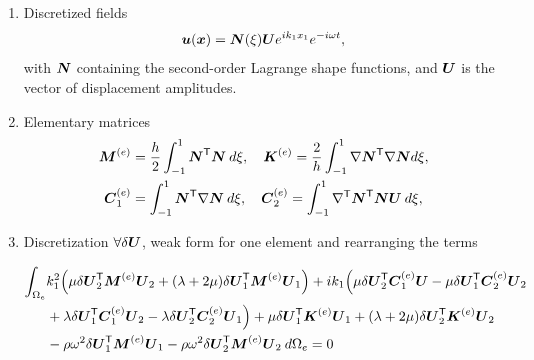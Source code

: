 \begin{enumerate}
\item Discretized fields 
\begin{equation}
    \boldsymbol u (\boldsymbol x) =\boldsymbol N (\xi) \boldsymbol U e^{ik_1 x_1}e^{-i\omega t},
\end{equation}
with $\boldsymbol N$ containing the second-order Lagrange shape functions, and $\boldsymbol U$ is the vector of displacement amplitudes.

\item Elementary matrices
\begin{equation}
    \begin{aligned}
        \boldsymbol M^{(e)}   &= \frac{h}{2} \int_{-1}^1 \boldsymbol N^\mathsf T \boldsymbol N \:d\xi, \quad
        \boldsymbol K^{(e)}   = \frac 2 h \int_{-1}^1 \nabla \boldsymbol N^{\mathsf T} \nabla \boldsymbol N d\xi,\\
        \boldsymbol C_1^{(e)} &= \int_{-1}^1 \boldsymbol N^{\mathsf T}\nabla \boldsymbol N \:d\xi, \quad
        \boldsymbol C_2^{(e)} = \int_{-1}^1 \nabla^\mathsf T \boldsymbol N^{\mathsf T} \boldsymbol N \boldsymbol U\:d\xi,\\
    \end{aligned}
\end{equation}

\item Discretization $\forall \delta \boldsymbol U$, weak form for one element and rearranging the terms

\begin{equation}
    \begin{aligned}
        \int_{\Omega_e} & k_1^2 \Big(
         \mu \delta \boldsymbol U_2^\mathsf T \boldsymbol M^{(e)} \boldsymbol U_2
        + (\lambda + 2\mu) \delta \boldsymbol U_1^\mathsf T \boldsymbol M^{(e)} \boldsymbol U_1\Big)
        + ik_1 \Big( \mu \delta \boldsymbol U_2^\mathsf T \boldsymbol C_1^{(e)} \boldsymbol U
        - \mu \delta \boldsymbol U_1^\mathsf T \boldsymbol C_2^{(e)} \boldsymbol U_2 \\ &
        + \lambda \delta \boldsymbol U_1^\mathsf T \boldsymbol C_1^{(e)} \boldsymbol U_2
        - \lambda \delta \boldsymbol U_2^\mathsf T \boldsymbol C_2^{(e)} \boldsymbol U_1 \Big)
        + \mu \delta \boldsymbol U_1^\mathsf T \boldsymbol K^{(e)} \boldsymbol U_1
        + (\lambda + 2\mu) \delta \boldsymbol U_2^\mathsf T \boldsymbol K^{(e)} \boldsymbol U_2 
        \\ &-\rho \omega^2 \delta \boldsymbol U_1^\mathsf T \boldsymbol M^{(e)} \boldsymbol U_1 -\rho \omega^2 \delta \boldsymbol U_2^\mathsf T \boldsymbol M^{(e)} \boldsymbol U_2 \:d\Omega_e = 0
    \end{aligned}
\end{equation}



\end{enumerate}
